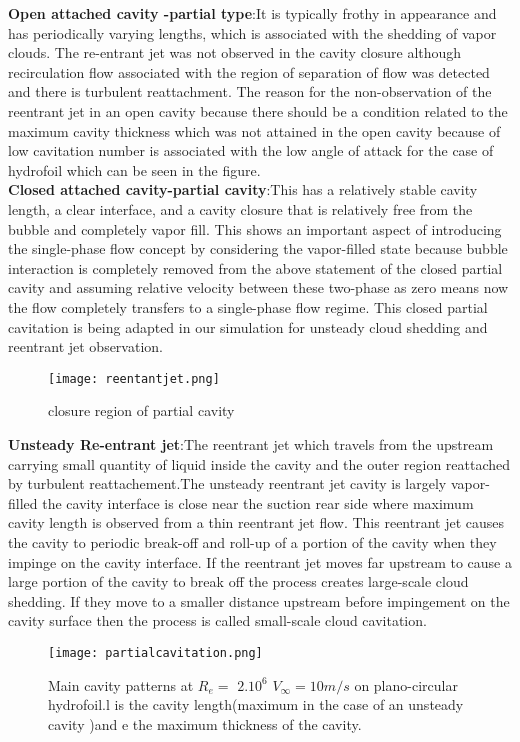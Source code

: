 \textbf{Open attached cavity -partial type}:It is typically frothy in appearance and has periodically varying lengths, which is associated with the shedding of vapor clouds. The re-entrant jet was not observed 
in the cavity closure although recirculation flow associated with the region of separation of flow was detected and there is turbulent reattachment. The reason for the non-observation of the reentrant jet in an open cavity
because there should be a condition related to the maximum cavity thickness which was not attained in the open cavity because of low cavitation number is associated with the low angle of attack for the case of hydrofoil
which can be seen in the figure.\\
\textbf{Closed attached cavity-partial cavity}:This has a relatively stable cavity length, a clear interface, and a cavity closure that is relatively free from the bubble and completely vapor fill. This 
shows an important aspect of introducing the single-phase flow concept by considering the vapor-filled state because bubble interaction is completely removed from the above statement of the closed partial cavity 
and assuming relative velocity between these two-phase as zero means now the flow completely transfers to a single-phase flow regime. This closed partial cavitation is being adapted in our simulation for 
unsteady cloud shedding and reentrant jet observation.\\
\begin{figure}[H]
 \centering
 \texttt{[image: reentantjet.png]}
 \caption{closure region of partial cavity}
  \label{fig:fig11}
\end{figure}
 \textbf{Unsteady Re-entrant jet}:The reentrant jet which travels from the upstream carrying small quantity of liquid inside the cavity and the outer region reattached by turbulent reattachement.The unsteady 
 reentrant jet cavity is largely vapor-filled the cavity interface is close near the suction rear side where maximum cavity length is observed
from a thin reentrant jet flow. This reentrant jet causes the cavity to periodic break-off and roll-up of a portion of the cavity when they impinge on the cavity interface. If the reentrant jet moves far upstream to cause a large portion of the cavity to 
break off the process creates large-scale cloud shedding. If they move to a smaller distance upstream before impingement on the cavity surface then the process is called small-scale cloud cavitation.
\begin{figure}[H]
 \centering
 \texttt{[image: partialcavitation.png]}
 \caption{Main cavity patterns at $R_e =$ $2.{10}^6$ ${V_{\infty}} =10{m}/{s}$ on plano-circular hydrofoil.l is the cavity length(maximum in the case of an unsteady cavity )and e the maximum thickness of the cavity.\\}
  \label{fig:fig12}
\end{figure}
